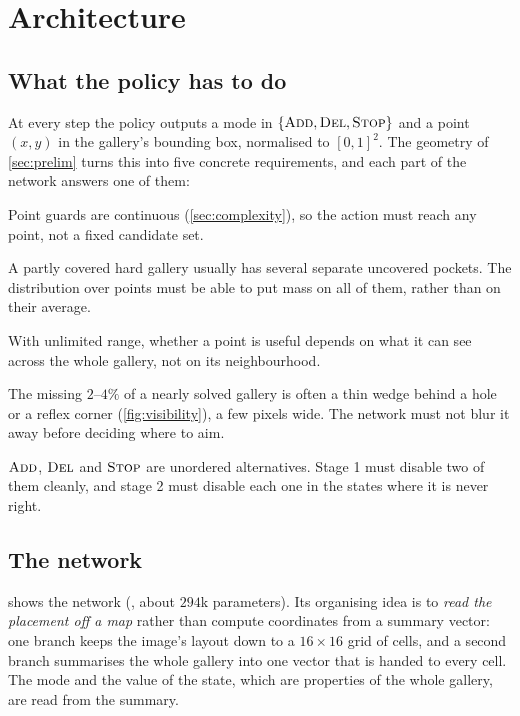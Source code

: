 \documentclass[11pt,a4paper]{article}
\begin{document}
\section{Architecture}\label{sec:arch}

\subsection{What the policy has to do}

At every step the policy outputs a mode in $\{\textsc{Add},\textsc{Del},\textsc{Stop}\}$ and a point $(x,y)$ in the
gallery's bounding box, normalised to $[0,1]^2$. The geometry of \cref{sec:prelim} turns this
into five concrete requirements, and each part of the network answers one of them:

\begin{description}[leftmargin=1.8em]
  \item[R1 Continuous placement.] Point guards are continuous (\cref{sec:complexity}), so
        the action must reach any point, not a fixed candidate set.
  \item[R2 Several targets at once.] A partly covered hard gallery usually has several
        separate uncovered pockets. The distribution over points must be able to put mass
        on all of them, rather than on their average.
  \item[R3 Global context.] With unlimited range, whether a point is useful depends on what
        it can see across the whole gallery, not on its neighbourhood.
  \item[R4 Fine localisation.] The missing $2$--$4\%$ of a nearly solved gallery is often a
        thin wedge behind a hole or a reflex corner (\cref{fig:visibility}), a few pixels
        wide. The network must not blur it away before deciding where to aim.
  \item[R5 Unordered modes with masking.] $\textsc{Add}$, $\textsc{Del}$ and $\textsc{Stop}$ are unordered
        alternatives. Stage 1 must disable two of them cleanly, and stage 2 must disable
        each one in the states where it is never right.
\end{description}

\subsection{The network}

 shows the network (, about $294$k parameters). Its
organising idea is to \emph{read the placement off a map} rather than compute coordinates
from a summary vector: one branch keeps the image's layout down to a $16\times16$ grid of
cells, and a second branch summarises the whole gallery into one vector that is handed to
every cell. The mode and the value of the state, which are properties of the whole gallery,
are read from the summary.
\end{document}
